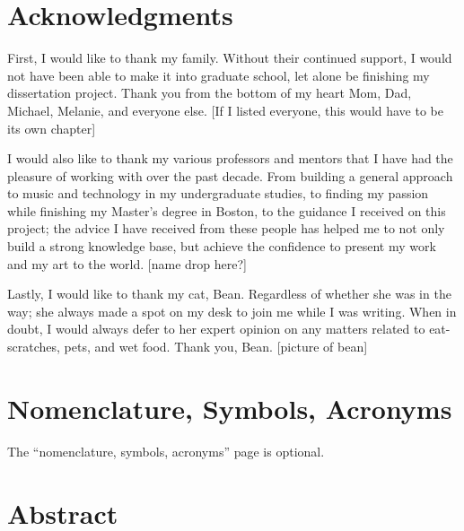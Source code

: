 \chapter{Acknowledgments}

First, I would like to thank my family. Without their continued support, I would not have been able to make it into graduate school, let alone be finishing my dissertation project. Thank you from the bottom of my heart Mom, Dad, Michael, Melanie, and everyone else. [If I listed everyone, this would have to be its own chapter]

I would also like to thank my various professors and mentors that I have had the pleasure of working with over the past decade. From building a general approach to music and technology in my undergraduate studies, to finding my passion while finishing my Master’s degree in Boston, to the guidance I received on this project; the advice I have received from these people has helped me to not only build a strong knowledge base, but achieve the confidence to present my work and my art to the world. [name drop here?]

Lastly, I would like to thank my cat, Bean. Regardless of whether she was in the way; she always made a spot on my desk to join me while I was writing. When in doubt, I would always defer to her expert opinion on any matters related to eat-scratches, pets, and wet food. Thank you, Bean.
[picture of bean]



\tableofcontents






\chapter{Nomenclature, Symbols, Acronyms}

The ``nomenclature, symbols, acronyms'' page is optional.


\chapter{Abstract}

